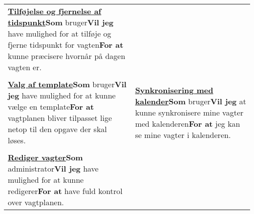 \begin{tabular}{p{2.5in}p{2.5in}}
\textbf{\underline{Tilføjelse og fjernelse af tidspunkt}}\newline \textbf{Som} bruger\newline \textbf{Vil jeg} have mulighed for at tilføje og fjerne tidspunkt for vagten\newline \textbf{For at} kunne præcisere hvornår på dagen vagten er.  \\\\

\textbf{\underline{Valg af template}}\newline \textbf{Som} bruger\newline \textbf{Vil jeg} have mulighed for at kunne vælge en template\newline \textbf{For at} vagtplanen bliver tilpasset lige netop til den opgave der skal løses.  & 

\textbf{\underline{Synkronisering med kalender}}\newline \textbf{Som} bruger\newline \textbf{Vil jeg} at kunne synkronisere mine vagter med kalenderen\newline \textbf{For at} jeg kan se mine vagter i kalenderen.  \\\\

\textbf{\underline{Rediger vagter}}\newline \textbf{Som} administrator\newline \textbf{Vil jeg} have mulighed for at kunne redigerer\newline \textbf{For at} have fuld kontrol over vagtplanen.  & 

\end{tabular}